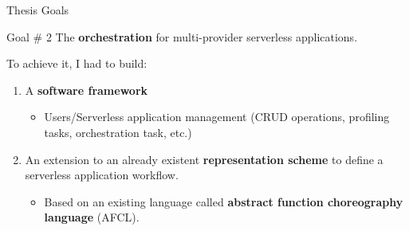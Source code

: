 \documentclass[13.5pt]{beamer}
\newcommand{\B}[1]{\textcolor{TorVergataColor}{\textbf{#1}}}
\begin{document}
\begin{frame}{Thesis Goals}
	
	\begin{block}{Goal $\#$ 2}
		\centering
		The \B{orchestration} for multi-provider serverless applications. 
	\end{block}
	
	\vspace{\baselineskip}
	To achieve it, I had to build:
	\vspace{\baselineskip}

	\begin{enumerate}
		\justifying
	
		\item A \B{software framework}
			\begin{itemize}
				\item Users/Serverless application management (CRUD operations, profiling tasks, orchestration task, etc.)
			\end{itemize}
		
		\vspace{\baselineskip} 
		\item An extension to an already existent \B{representation scheme} to define a serverless application workflow.
		\begin{itemize}
			\item Based on an existing language called \B{abstract function choreography language} (AFCL).
		\end{itemize}
		
	\end{enumerate}
	
\end{frame} 

\end{document}
